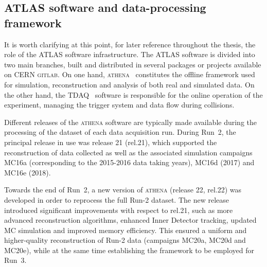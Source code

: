 
\subsection{ATLAS software and data-processing framework}
\label{sec:athena}

It is worth clarifying at this point, for later reference throughout the thesis, the role of the ATLAS software infrastructure. The ATLAS software is divided into two main branches, built and distributed in several packages or projects available on CERN \textsc{gitlab}. On one hand, \textsc{athena}~\cite{athena} constitutes the offline framework used for simulation, reconstruction and analysis of both real and simulated data. On the other hand, the TDAQ~\cite{tdaq} software is responsible for the online operation of the experiment, managing the trigger system and data flow during collisions. 

Different releases of the \textsc{athena} software are typically made available during the processing of the dataset of each data acquisition run. During Run~2, the principal release in use was release 21 (rel.21), which supported the reconstruction of data collected as well as the associated simulation campaigns MC16a (corresponding to the 2015-2016 data taking years), MC16d (2017) and MC16e (2018). 

Towards the end of Run~2, a new version of \textsc{athena} (release 22, rel.22) was developed in order to reprocess the full Run-2 dataset. The new release introduced significant improvements with respect to rel.21, such as more advanced reconstruction algorithms, enhanced Inner Detector tracking, updated MC simulation and improved memory efficiency. This ensured a uniform and higher-quality reconstruction of Run-2 data (campaigns MC20a, MC20d and MC20e), while at the same time establishing the framework to be employed for Run~3.

